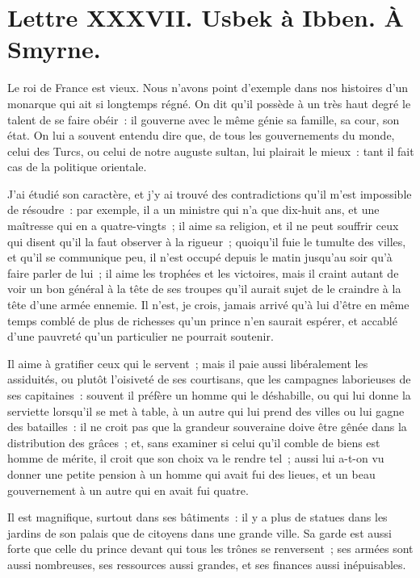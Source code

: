 \documentclass[french,twoside]{book} %
\newcommand{\dateline}[1]{\medskip{\RaggedLeft{#1}\par}\bigskip}
\begin{document}
\dateline{À Paris, le dernier de la lune de Zilhagé, 1713.}
\section[{Lettre XXXVII. Usbek à Ibben. À Smyrne.}]{Lettre XXXVII. Usbek à Ibben. À Smyrne.}\renewcommand{\leftmark}{Lettre XXXVII. Usbek à Ibben. À Smyrne.}

\noindent Le roi de France est vieux. Nous n’avons point d’exemple dans nos histoires d’un monarque qui ait si longtemps régné. On dit qu’il possède à un très haut degré le talent de se faire obéir : il gouverne avec le même génie sa famille, sa cour, son état. On lui a souvent entendu dire que, de tous les gouvernements du monde, celui des Turcs, ou celui de notre auguste sultan, lui plairait le mieux : tant il fait cas de la politique orientale.\par
J’ai étudié son caractère, et j’y ai trouvé des contradictions qu’il m’est impossible de résoudre : par exemple, il a un ministre qui n’a que dix-huit ans, et une maîtresse qui en a quatre-vingts ; il aime sa religion, et il ne peut souffrir ceux qui disent qu’il la faut observer à la rigueur ; quoiqu’il fuie le tumulte des villes, et qu’il se communique peu, il n’est occupé depuis le matin jusqu’au soir qu’à faire parler de lui ; il aime les trophées et les victoires, mais il craint autant de voir un bon général à la tête de ses troupes qu’il aurait sujet de le craindre à la tête d’une armée ennemie. Il n’est, je crois, jamais arrivé qu’à lui d’être en même temps comblé de plus de richesses qu’un prince n’en saurait espérer, et accablé d’une pauvreté qu’un particulier ne pourrait soutenir.\par
Il aime à gratifier ceux qui le servent ; mais il paie aussi libéralement les assiduités, ou plutôt l’oisiveté de ses courtisans, que les campagnes laborieuses de ses capitaines : souvent il préfère un homme qui le déshabille, ou qui lui donne la serviette lorsqu’il se met à table, à un autre qui lui prend des villes ou lui gagne des batailles : il ne croit pas que la grandeur souveraine doive être gênée dans la distribution des grâces ; et, sans examiner si celui qu’il comble de biens est homme de mérite, il croit que son choix va le rendre tel ; aussi lui a-t-on vu donner une petite pension à un homme qui avait fui des lieues, et un beau gouvernement à un autre qui en avait fui quatre.\par
Il est magnifique, surtout dans ses bâtiments : il y a plus de statues dans les jardins de son palais que de citoyens dans une grande ville. Sa garde est aussi forte que celle du prince devant qui tous les trônes se renversent ; ses armées sont aussi nombreuses, ses ressources aussi grandes, et ses finances aussi inépuisables.\par
\end{document}
